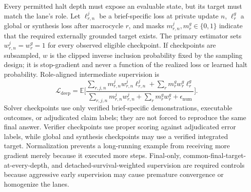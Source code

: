 \documentclass[10pt,a4paper]{article}
\newcommand{\eps}{\epsilon}
\newcommand{\Lcal}{\mathcal{L}}
\newcommand{\E}{\mathbb{E}}
\begin{document}
Every permitted halt depth must expose an evaluable state, but its target must
match the lane's role. Let $\ell^j_{r,n}$ be a brief-specific loss at private
update $n$, $\ell^g_r$ a global or synthesis loss after macrocycle $r$, and
masks $m^j_{r,n}, m^g_r \in \{0,1\}$ indicate that the required externally
grounded target exists. The primary estimator sets $w^j_{r,n} = w^g_r = 1$ for
every observed eligible checkpoint. If checkpoints are subsampled, $w$ is the
clipped inverse inclusion probability fixed by the sampling design; it is
stop-gradient and never a function of the realized loss or learned halt
probability. Role-aligned intermediate supervision is
\begin{equation}
\Lcal_{\mathrm{deep}} = \E\Biggl[
\frac{\sum_{r,j,n} m^j_{r,n} w^j_{r,n} \ell^j_{r,n}
  + \sum_r m^g_r w^g_r \ell^g_r}
{\sum_{r,j,n} m^j_{r,n} w^j_{r,n} + \sum_r m^g_r w^g_r
  + \eps_{\mathrm{num}}} \Biggr].
\end{equation}
Solver checkpoints use only verified brief-specific demonstrations, executable
outcomes, or adjudicated claim labels; they are not forced to reproduce the
same final answer. Verifier checkpoints use proper scoring against adjudicated
error labels, while global and synthesis checkpoints may use a verified
integrated target. Normalization prevents a long-running example from
receiving more gradient merely because it executed more steps. Final-only,
common-final-target-at-every-depth, and detached-survival-weighted supervision
are required controls because aggressive early supervision may cause premature
convergence or homogenize the lanes.
\end{document}
